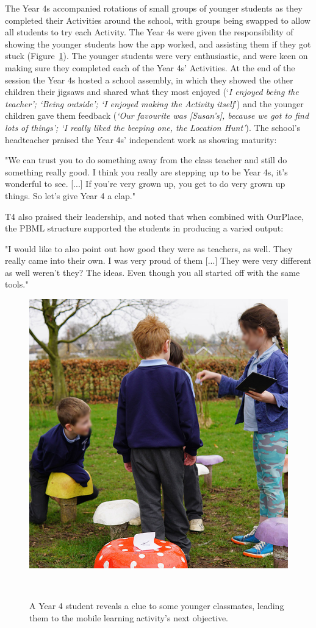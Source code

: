 The Year 4s accompanied rotations of small groups of younger students as they completed their Activities around the school, with groups being swapped to allow all students to try each Activity. The Year 4s were given the responsibility of showing the younger students how the app worked, and assisting them if they got stuck (Figure~\ref{fig:Mushrooms}). The younger students were very enthusiastic, and were keen on making sure they completed each of the Year 4s' Activities. At the end of the session the Year 4s hosted a school assembly, in which they showed the other children their jigsaws and shared what they most enjoyed (`\textit{I enjoyed being the teacher'; `Being outside'; `I enjoyed making the Activity itself}') and the younger children gave them feedback (\textit{`Our favourite was [Susan's], because we got to find lots of things'; `I really liked the beeping one, the Location Hunt'}). The school's headteacher praised the Year 4s' independent work as showing maturity: 

\begin{displayquote}
"We can trust you to do something away from the class teacher and still do something really good. I think you really are stepping up to be Year 4s, it's wonderful to see. [...] If you're very grown up, you get to do very grown up things. So let's give Year 4 a clap."
\end{displayquote}

T4 also praised their leadership, and noted that when combined with OurPlace, the PBML structure supported the students in producing a varied output:

\begin{displayquote}
"I would like to also point out how good they were as teachers, as well. They really came into their own. I was very proud of them [...] They were very different as well weren't they? The ideas. Even though you all started off with the same tools."
\end{displayquote}

\begin{figure}
\centering
  \includegraphics[width=0.66\columnwidth]{images/chapter08/mushrooms.jpg}
  \caption[Year 4 students using OurPlace]{A Year 4 student reveals a clue to some younger classmates, leading them to the mobile learning activity's next objective. }~\label{fig:Mushrooms}
\end{figure}

